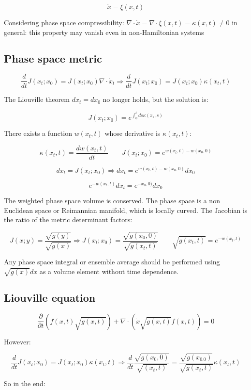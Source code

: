 $$\dot{x} = \xi(x, t)$$

Considering phase space compressibility: $\nabla\cdot\dot{x} = \nabla\cdot\xi(x, t) = \kappa(x, t)\neq 0$ in general: this property may vanish even in non-Hamiltonian systems

	\subsection{Phase space metric}

	$$\frac{d}{dt}J(x_t;x_0) = J(x_t;x_0)\nabla\cdot\dot{x}_t\Rightarrow\frac{d}{dt}J(x_t;x_0) = J(x_t;x_0)\kappa(x_t, t)$$

	The Liouville theorem $dx_t = dx_0$ no longer holds, but the solution is:

	$$J(x_t;x_0) = e^{\int_0^tds\kappa(x_s, s)}$$

	There exists a function $w(x_t,t)$ whose derivative is $\kappa(x_t, t)$:

	$$\kappa(x_t, t) = \frac{dw(x_t, t)}{dt}\qquad J(x_t; x_0) = e^{w(x_t, t)-w(x_0, 0)}$$

	$$dx_t = J(x_t;x_0)\Rightarrow dx_t = e^{w(x_t, t) - w(x_0, 0)}dx_0$$

	$$e^{-w(x_t, t)}dx_t = e^{-x_0, 0)}dx_0$$

	The weighted phase space volume is conserved.
	The phase space is a non Euclidean space or Reimannian manifold, which is locally curved.
	The Jacobian is the ratio of the metric determinant factors:

	$$J(x; y) = \frac{\sqrt{g(y)}}{\sqrt{g(x)}}\Rightarrow J(x_t;x_0) = \frac{\sqrt{g(x_0, 0)}}{\sqrt{g(x_t, t)}}\qquad \sqrt{g(x_t, t)} = e^{-w(x_t, t)}$$

	Any phase space integral or ensemble average should be performed using $\sqrt{g(x)}dx$ as a volume element without time dependence.

	\subsection{Liouville equation}


	$$\frac{\partial}{\partial t}(f(x, t)\sqrt{g(x, t)})+\nabla\cdot(\dot{x}\sqrt{g(x, t)}f(x,t)) = 0$$

	However:

	$$\frac{d}{dt}J(x_t;x_0) = J(x_t;x_0)\kappa(x_t, t)\Rightarrow \frac{d}{dt}\frac{\sqrt{g(x_0, 0)}}{\sqrt{(x_t,t)}} = \frac{\sqrt{g(x_0.0)}}{\sqrt{g(x_t,t)}}\kappa(x_t, t)$$

	So in the end:

